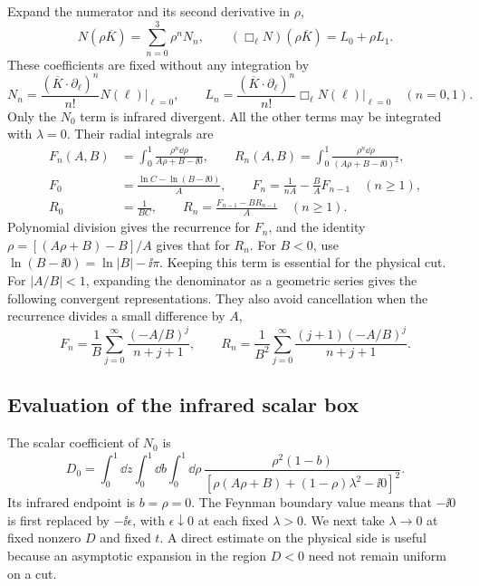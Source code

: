 Expand the numerator and its second derivative in $\rho$,
\begin{equation}
 N(\rho\overline K)=\sum_{n=0}^3\rho^n N_n,
 \qquad (\Box_\ell N)(\rho\overline K)=L_0+\rho L_1.
\end{equation}
These coefficients are fixed without any integration by
\begin{equation}
 N_n=\frac{(\overline K\cdot\partial_\ell)^n}{n!}N(\ell)\big|_{\ell=0},
 \qquad
 L_n=\frac{(\overline K\cdot\partial_\ell)^n}{n!}
       \Box_\ell N(\ell)\big|_{\ell=0}\quad(n=0,1).
\end{equation}
Only the $N_0$ term is infrared divergent. All the other terms may
be integrated with $\lambda=0$. Their radial integrals are
\begin{align}
 F_n(A,B)&=\int_0^1\frac{\rho^n\dd\rho}{A\rho+B-\ii0},\qquad
 R_n(A,B)=\int_0^1\frac{\rho^n\dd\rho}{(A\rho+B-\ii0)^2},\\
 F_0&=\frac{\ln C-\ln(B-\ii0)}A,\qquad
 F_n=\frac1{nA}-\frac BA F_{n-1}\quad(n\geq1),\\
 R_0&=\frac1{BC},\qquad
 R_n=\frac{F_{n-1}-BR_{n-1}}A\quad(n\geq1).
 \label{eq:comp-supp-radial-moments}
\end{align}
Polynomial division gives the recurrence for $F_n$, and the identity
$\rho=[(A\rho+B)-B]/A$ gives that for $R_n$.
For $B<0$, use $\ln(B-\ii0)=\ln|B|-\ii\pi$.
Keeping this term is essential for the physical cut.
For $|A/B|<1$, expanding the denominator as a geometric series gives
the following convergent representations. They also avoid cancellation
when the recurrence divides a small difference by $A$,
\begin{equation}
 F_n=\frac1B\sum_{j=0}^\infty\frac{(-A/B)^j}{n+j+1},\qquad
 R_n=\frac1{B^2}\sum_{j=0}^\infty
                    \frac{(j+1)(-A/B)^j}{n+j+1}.
\end{equation}

\subsection{Evaluation of the infrared scalar box}
The scalar coefficient of $N_0$ is
\begin{equation}
 D_0=\int_0^1\dd z\int_0^1\dd b\int_0^1\dd\rho\,
 \frac{\rho^2(1-b)}{[\rho(A\rho+B)+(1-\rho)\lambda^2-\ii0]^2}.
\end{equation}
Its infrared endpoint is $b=\rho=0$. The Feynman boundary value
means that $-\ii0$ is first replaced by $-\ii\epsilon$, with
$\epsilon\downarrow0$ at each fixed $\lambda>0$. We next take
$\lambda\to0$ at fixed nonzero $D$ and fixed $t$. A direct estimate
on the physical side is useful because an asymptotic expansion in the
region $D<0$ need not remain uniform on a cut.

